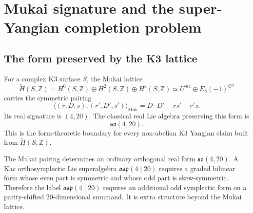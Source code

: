 \providecommand{\K}{\mathbf{k}}
\providecommand{\Z}{\mathbb{Z}}
\providecommand{\Q}{\mathbb{Q}}
\providecommand{\C}{\mathbb{C}}
\providecommand{\N}{\mathbb{N}}
\providecommand{\R}{\mathbb{R}}
\providecommand{\bC}{\mathbb{C}}
\providecommand{\bZ}{\mathbb{Z}}
\providecommand{\bQ}{\mathbb{Q}}
\providecommand{\bR}{\mathbb{R}}
\providecommand{\fgl}{\mathfrak{gl}}
\providecommand{\fsl}{\mathfrak{sl}}
\providecommand{\fso}{\mathfrak{so}}
\providecommand{\osp}{\mathfrak{osp}}
\providecommand{\fg}{\mathfrak{g}}
\providecommand{\fh}{\mathfrak{h}}
\providecommand{\CoHA}{\mathrm{CoHA}}
\providecommand{\Rep}{\mathrm{Rep}}
\providecommand{\End}{\mathrm{End}}
\providecommand{\Hom}{\mathrm{Hom}}
\providecommand{\Id}{\mathrm{Id}}
\providecommand{\tr}{\mathrm{tr}}
\providecommand{\str}{\mathrm{str}}
\providecommand{\Ber}{\mathrm{Ber}}
\providecommand{\Coh}{\mathrm{Coh}}
\providecommand{\Hilb}{\mathrm{Hilb}}
\providecommand{\kBKM}{\kappa_{\mathrm{BKM}}}
\providecommand{\kch}{\kappa_{\mathrm{ch}}}
\providecommand{\kcat}{\kappa_{\mathrm{cat}}}
\providecommand{\kfiber}{\kappa_{\mathrm{fiber}}}
\providecommand{\Yplus}{Y^+}

\section*{Mukai signature and the super-Yangian completion problem}

\subsection*{The form preserved by the K3 lattice}

For a complex K3 surface \(S\), the Mukai lattice
\[
  \widetilde H(S,\Z)
  =
  H^0(S,\Z)\oplus H^2(S,\Z)\oplus H^4(S,\Z)
  \simeq U^{\oplus 4}\oplus E_8(-1)^{\oplus 2}
\]
carries the symmetric pairing
\[
  \langle (r,D,s),(r',D',s')\rangle_{\mathrm{Muk}}
  =
  D\cdot D' - r s' - r' s .
\]
Its real signature is \((4,20)\).  The classical real Lie algebra
preserving this form is
\[
  \fso(4,20).
\]
This is the form-theoretic boundary for every non-abelian K3 Yangian
claim built from \(\widetilde H(S,\Z)\).

\begin{proposition}
\label{prop:mukai-form-orthogonal-boundary}
The Mukai pairing determines an ordinary orthogonal real form
\(\fso(4,20)\).  A Kac orthosymplectic Lie superalgebra
\(\osp(4\mid 20)\) requires a graded bilinear form whose even part is
symmetric and whose odd part is skew-symmetric.  Therefore the label
\(\osp(4\mid 20)\) requires an additional odd symplectic form on a
parity-shifted \(20\)-dimensional summand.  It is extra structure
beyond the Mukai lattice.
\end{proposition}

